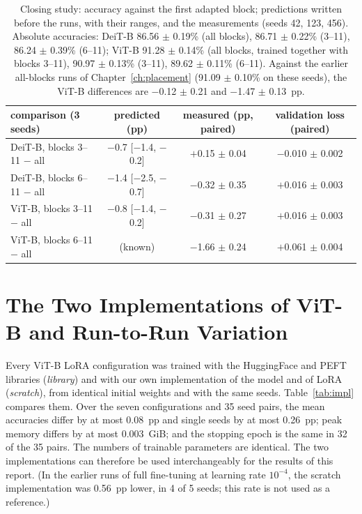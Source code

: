 \begin{table}[H]
\centering\footnotesize
\begin{tabular}{lccc}
\toprule
comparison (3 seeds) & predicted (pp) & measured (pp, paired) & validation loss (paired) \\
\midrule
DeiT-B, blocks 3--11 $-$ all & $-$0.7 [$-$1.4, $-$0.2] & $+$0.15 $\pm$ 0.04 & $-$0.010 $\pm$ 0.002 \\
DeiT-B, blocks 6--11 $-$ all & $-$1.4 [$-$2.5, $-$0.7] & $-$0.32 $\pm$ 0.35 & $+$0.016 $\pm$ 0.003 \\
ViT-B, blocks 3--11 $-$ all & $-$0.8 [$-$1.4, $-$0.2] & $-$0.31 $\pm$ 0.27 & $+$0.016 $\pm$ 0.003 \\
ViT-B, blocks 6--11 $-$ all & (known) & $-$1.66 $\pm$ 0.24 & $+$0.061 $\pm$ 0.004 \\
\bottomrule
\end{tabular}
\caption{Closing study: accuracy against the first adapted block; predictions written before the runs, with their ranges, and the
measurements (seeds 42, 123, 456). Absolute accuracies: DeiT-B 86.56 $\pm$ 0.19\% (all blocks), 86.71 $\pm$ 0.22\%
(3--11), 86.24 $\pm$ 0.39\% (6--11); ViT-B 91.28 $\pm$ 0.14\% (all blocks, trained together with blocks 3--11), 90.97 $\pm$ 0.13\% (3--11), 89.62 $\pm$
0.11\% (6--11). Against the earlier all-blocks runs of Chapter~\ref{ch:placement} (91.09 $\pm$ 0.10\% on these
seeds), the ViT-B differences are $-$0.12 $\pm$ 0.21 and $-$1.47 $\pm$ 0.13~pp.}
\label{tab:acc_pred}
\end{table}

\chapter{The Two Implementations of ViT-B and Run-to-Run Variation}
\label{app:impl}

Every ViT-B LoRA configuration was trained with the HuggingFace and PEFT libraries (\emph{library}) and with our own
implementation of the model and of LoRA (\emph{scratch}), from identical initial weights and with the same seeds.
Table~\ref{tab:impl} compares them. Over the seven configurations and 35 seed pairs, the mean accuracies differ by at
most 0.08~pp and single seeds by at most 0.26~pp; peak memory differs by at most 0.003~GiB; and the stopping epoch is
the same in 32 of the 35 pairs. The numbers of trainable parameters are identical. The two implementations can
therefore be used interchangeably for the results of this report. (In the earlier runs of full fine-tuning at
learning rate $10^{-4}$, the scratch implementation was 0.56~pp lower, in 4 of 5 seeds; this rate is not used as a
reference.)

